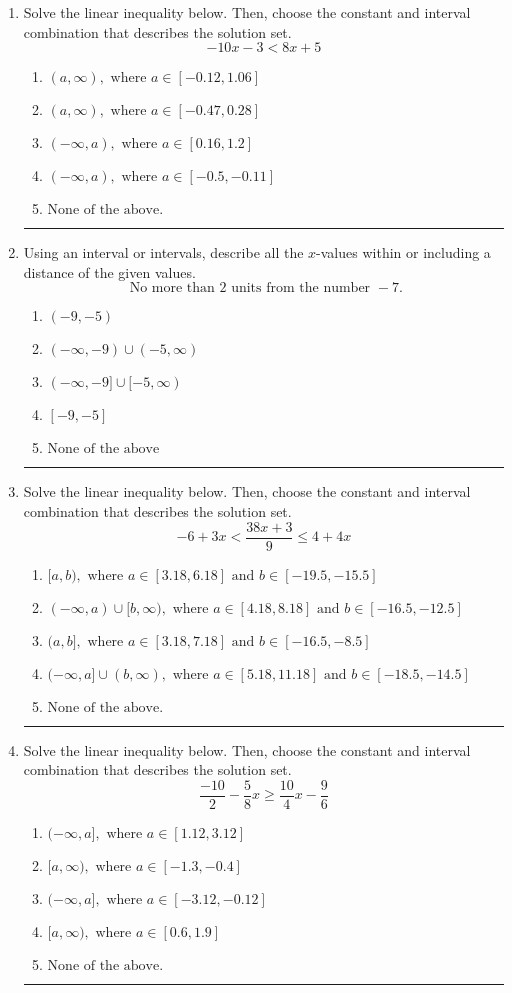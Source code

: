 \documentclass[14pt]{extbook}
\newcommand{\litem}[1]{\item#1\hspace*{-1cm}\rule{\textwidth}{0.4pt}}
\begin{document}
\begin{enumerate}
\litem{
Solve the linear inequality below. Then, choose the constant and interval combination that describes the solution set.\[ -10x -3 < 8x + 5 \]\begin{enumerate}[label=\Alph*.]
\item \( (a, \infty), \text{ where } a \in [-0.12, 1.06] \)
\item \( (a, \infty), \text{ where } a \in [-0.47, 0.28] \)
\item \( (-\infty, a), \text{ where } a \in [0.16, 1.2] \)
\item \( (-\infty, a), \text{ where } a \in [-0.5, -0.11] \)
\item \( \text{None of the above}. \)

\end{enumerate} }
\litem{
Using an interval or intervals, describe all the $x$-values within or including a distance of the given values.\[ \text{ No more than } 2 \text{ units from the number } -7. \]\begin{enumerate}[label=\Alph*.]
\item \( (-9, -5) \)
\item \( (-\infty, -9) \cup (-5, \infty) \)
\item \( (-\infty, -9] \cup [-5, \infty) \)
\item \( [-9, -5] \)
\item \( \text{None of the above} \)

\end{enumerate} }
\litem{
Solve the linear inequality below. Then, choose the constant and interval combination that describes the solution set.\[ -6 + 3 x < \frac{38 x + 3}{9} \leq 4 + 4 x \]\begin{enumerate}[label=\Alph*.]
\item \( [a, b), \text{ where } a \in [3.18, 6.18] \text{ and } b \in [-19.5, -15.5] \)
\item \( (-\infty, a) \cup [b, \infty), \text{ where } a \in [4.18, 8.18] \text{ and } b \in [-16.5, -12.5] \)
\item \( (a, b], \text{ where } a \in [3.18, 7.18] \text{ and } b \in [-16.5, -8.5] \)
\item \( (-\infty, a] \cup (b, \infty), \text{ where } a \in [5.18, 11.18] \text{ and } b \in [-18.5, -14.5] \)
\item \( \text{None of the above.} \)

\end{enumerate} }
\litem{
Solve the linear inequality below. Then, choose the constant and interval combination that describes the solution set.\[ \frac{-10}{2} - \frac{5}{8} x \geq \frac{10}{4} x - \frac{9}{6} \]\begin{enumerate}[label=\Alph*.]
\item \( (-\infty, a], \text{ where } a \in [1.12, 3.12] \)
\item \( [a, \infty), \text{ where } a \in [-1.3, -0.4] \)
\item \( (-\infty, a], \text{ where } a \in [-3.12, -0.12] \)
\item \( [a, \infty), \text{ where } a \in [0.6, 1.9] \)
\item \( \text{None of the above}. \)


\end{enumerate}}
\end{enumerate}
\end{document}
